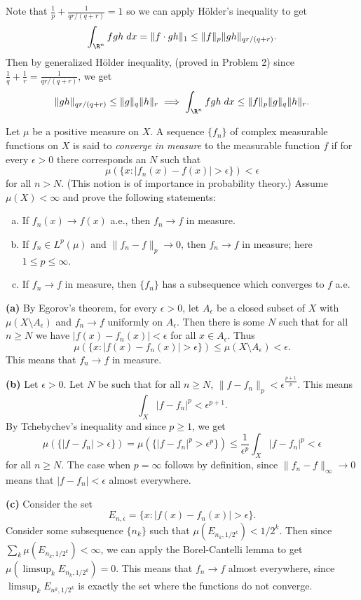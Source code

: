 \documentclass[11pt,letterpaper]{article}
\begin{document}
\begin{solution}
    \quad Note that $\frac{1}{p}+\frac{1}{qr / (q+r)} = 1$ so we can apply H\"older's inequality to get
    \[
        \int_{\R^n} fgh\;dx = \|f\cdot gh\|_1 \leq \|f\|_p\|gh\|_{qr / (q+r)}
    .\]  
    Then by generalized H\"older inequality, (proved in Problem 2) since $\frac{1}{q}+\frac{1}{r}=\frac{1}{qr /(q+r)}$, we get
    \[
        \|gh\|_{qr / (q+r)} \leq \|g\|_q\|h\|_r \implies \int_{\R^n} fgh\;dx \leq \|f\|_p\|g\|_q\|h\|_r
    .\] 
\end{solution}

\begin{problem}
    Let $\mu$ be a positive measure on $X$. A sequence $\{f_n\}$ of complex measurable functions on $X$ is said to \emph{converge in measure} to the measurable function $f$ if for every $\epsilon>0$ there corresponds an $N$ such that
    \[
        \mu(\{x : |f_n(x) - f(x)|>\epsilon\}) < \epsilon
    \]
    for all $n > N$. (This notion is of importance in probability theory.) Assume $\mu(X)<\infty$ and prove the following statements:
    \begin{enumerate}[(a)]
        \item If $f_n(x)\to f(x)$ a.e., then $f_n \to f$ in measure.
        \item If $f_n\in L^p(\mu)$ and $\|f_n-f\|_p \to 0$, then $f_n \to f$ in measure; here $1\leq p\leq \infty$.
        \item If $f_n\to f$ in measure, then $\{f_n\}$ has a subsequence which converges to $f$ a.e.  
    \end{enumerate}  
\end{problem}

\begin{solution}
    \textbf{(a)} By Egorov's theorem, for every $\epsilon>0$, let $A_\epsilon$ be a closed subset of $X$ with $\mu(X\setminus A_\epsilon)$ and $f_n\to f$ uniformly on $A_\epsilon$. Then there is some $N$ such that for all $n\geq N$ we have $|f(x)-f_n(x)|<\epsilon$ for all $x\in A_\epsilon$. Thus
    \[
        \mu(\{x : |f(x)-f_n(x)| > \epsilon\}) \leq \mu(X\setminus A_\epsilon) <\epsilon
    .\]
    This means that $f_n \to f$ in measure.

    \textbf{(b)} Let $\epsilon>0$. Let $N$ be such that for all $n \geq N$, $\|f-f_n\|_p < \epsilon^{\frac{p+1}{p}}$. This means
    \[
        \int_X |f-f_n|^p < \epsilon^{p+1}
    .\] 
    By Tchebychev's inequality and since $p\geq 1$, we get
    \[
        \mu(\{|f-f_n|>\epsilon\}) = \mu(\{|f-f_n|^p>\epsilon^p\}) \leq \frac{1}{\epsilon^p}\int_X |f-f_n|^p < \epsilon
    \]
    for all $n\geq N$. The case when $p=\infty$ follows by definition, since $\|f_n-f\|_\infty\to 0$ means that $|f-f_n|< \epsilon$ almost everywhere. 
    
    \textbf{(c)} Consider the set
    \[
        E_{n,\epsilon} = \{x : |f(x)-f_n(x)|>\epsilon\}
    .\]  
    Consider some subsequence $\{n_k\}$ such that $\mu(E_{n_k, 1/2^k}) < 1 /2^k$. Then since $\sum_k \mu(E_{n_k, 1 /2^k}) < \infty$, we can apply the Borel-Cantelli lemma to get $\mu(\limsup_k E_{n_k, 1 /2^k})=0$. This means that $f_n \to f$ almost everywhere, since $\limsup_k E_{n^k, 1 /2^k}$ is exactly the set where the functions do not converge.  
\end{solution}
\end{document}
